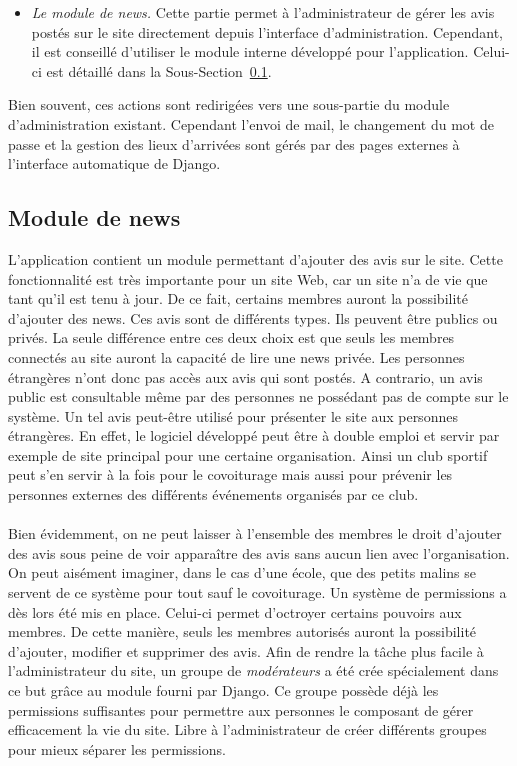 \documentclass[12pt, a4paper, oneside]{article}
\begin{document}
{{\begin{itemize}
        \item \textit{Le module de news.} Cette partie permet à l'administrateur de gérer les avis postés sur le site directement depuis l'interface d'administration. Cependant, il est conseillé d'utiliser le module interne développé pour l'application. Celui-ci est détaillé dans la Sous-Section~\ref{news}.\\
    \end{itemize}
    Bien souvent, ces actions sont redirigées vers une sous-partie du module d'administration existant. Cependant l'envoi de mail, le changement du mot de passe et la gestion des lieux d'arrivées sont gérés par des pages externes à l'interface automatique de Django.
     
\subsection{Module de news}\label{news}
    L'application contient un module permettant d'ajouter des avis sur le site. Cette fonctionnalité est très importante pour un site Web, car un site n'a de vie que tant qu'il est tenu à jour. De ce fait, certains membres auront la possibilité d'ajouter des news. Ces avis sont de différents types. Ils peuvent être publics ou privés. La seule différence entre ces deux choix est que seuls les membres connectés au site auront la capacité de lire une news privée. Les personnes étrangères n'ont donc pas accès aux avis qui sont postés. A contrario, un avis public est consultable même par des personnes ne possédant pas de compte sur le système. Un tel avis peut-être utilisé pour présenter le site aux personnes étrangères. En effet, le logiciel développé peut être à double emploi et servir par exemple de site principal pour une certaine organisation. Ainsi un club sportif peut s'en servir à la fois pour le covoiturage mais aussi pour prévenir les personnes externes des différents événements organisés par ce club.\\\\
    \indent Bien évidemment, on ne peut laisser à l'ensemble des membres le droit d'ajouter des avis sous peine de voir apparaître des avis sans aucun lien avec l'organisation. On peut aisément imaginer, dans le cas d'une école, que des petits malins se servent de ce système pour tout sauf le covoiturage. Un système de permissions a dès lors été mis en place. Celui-ci permet d'octroyer certains pouvoirs aux membres. De cette manière, seuls les membres autorisés auront la possibilité d'ajouter, modifier et supprimer des avis. Afin de rendre la tâche plus facile à l'administrateur du site, un groupe de \textit{modérateurs} a été crée spécialement dans ce but grâce au module fourni par Django. Ce groupe possède déjà les permissions suffisantes pour permettre aux personnes le composant de gérer efficacement la vie du site. Libre à l'administrateur de créer différents groupes pour mieux séparer les permissions.\\\\
}}
\end{document}
